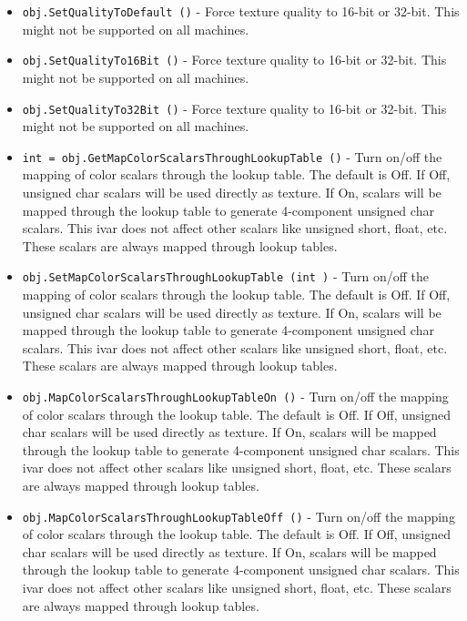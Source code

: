 \begin{itemize}
\item  \verb|obj.SetQualityToDefault ()| -  Force texture quality to 16-bit or 32-bit.
 This might not be supported on all machines.

\item  \verb|obj.SetQualityTo16Bit ()| -  Force texture quality to 16-bit or 32-bit.
 This might not be supported on all machines.

\item  \verb|obj.SetQualityTo32Bit ()| -  Force texture quality to 16-bit or 32-bit.
 This might not be supported on all machines.

\item  \verb|int = obj.GetMapColorScalarsThroughLookupTable ()| -  Turn on/off the mapping of color scalars through the lookup table.
 The default is Off. If Off, unsigned char scalars will be used
 directly as texture. If On, scalars will be mapped through the
 lookup table to generate 4-component unsigned char scalars.
 This ivar does not affect other scalars like unsigned short, float,
 etc. These scalars are always mapped through lookup tables.

\item  \verb|obj.SetMapColorScalarsThroughLookupTable (int )| -  Turn on/off the mapping of color scalars through the lookup table.
 The default is Off. If Off, unsigned char scalars will be used
 directly as texture. If On, scalars will be mapped through the
 lookup table to generate 4-component unsigned char scalars.
 This ivar does not affect other scalars like unsigned short, float,
 etc. These scalars are always mapped through lookup tables.

\item  \verb|obj.MapColorScalarsThroughLookupTableOn ()| -  Turn on/off the mapping of color scalars through the lookup table.
 The default is Off. If Off, unsigned char scalars will be used
 directly as texture. If On, scalars will be mapped through the
 lookup table to generate 4-component unsigned char scalars.
 This ivar does not affect other scalars like unsigned short, float,
 etc. These scalars are always mapped through lookup tables.

\item  \verb|obj.MapColorScalarsThroughLookupTableOff ()| -  Turn on/off the mapping of color scalars through the lookup table.
 The default is Off. If Off, unsigned char scalars will be used
 directly as texture. If On, scalars will be mapped through the
 lookup table to generate 4-component unsigned char scalars.
 This ivar does not affect other scalars like unsigned short, float,
 etc. These scalars are always mapped through lookup tables.


\end{itemize}
